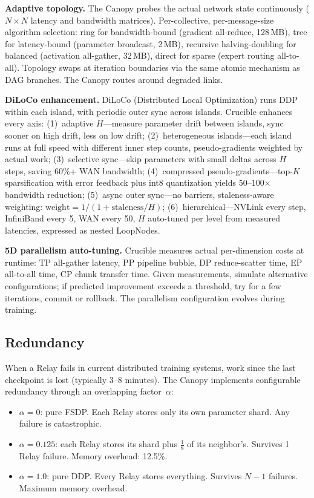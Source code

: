 \textbf{Adaptive topology.}
The Canopy probes the actual network state continuously ($N \times N$ latency and bandwidth matrices).
Per-collective, per-message-size algorithm selection: ring for bandwidth-bound (gradient all-reduce, 128\,MB), tree for latency-bound (parameter broadcast, 2\,MB), recursive halving-doubling for balanced (activation all-gather, 32\,MB), direct for sparse (expert routing all-to-all).
Topology swaps at iteration boundaries via the same atomic mechanism as DAG branches.
The Canopy routes around degraded links.

\textbf{DiLoCo enhancement.}
DiLoCo (Distributed Local Optimization) runs DDP within each island, with periodic outer sync across islands.
Crucible enhances every axis:
(1)~adaptive $H$---measure parameter drift between islands, sync sooner on high drift, less on low drift;
(2)~heterogeneous islands---each island runs at full speed with different inner step counts, pseudo-gradients weighted by actual work;
(3)~selective sync---skip parameters with small deltas across $H$ steps, saving 60\%+ WAN bandwidth;
(4)~compressed pseudo-gradients---top-$K$ sparsification with error feedback plus int8 quantization yields 50--100$\times$ bandwidth reduction;
(5)~async outer sync---no barriers, staleness-aware weighting: $\text{weight} = 1/(1 + \text{staleness}/H)$;
(6)~hierarchical---NVLink every step, InfiniBand every 5, WAN every 50, $H$ auto-tuned per level from measured latencies, expressed as nested LoopNodes.

\textbf{5D parallelism auto-tuning.}
Crucible measures actual per-dimension costs at runtime: TP all-gather latency, PP pipeline bubble, DP reduce-scatter time, EP all-to-all time, CP chunk transfer time.
Given measurements, simulate alternative configurations; if predicted improvement exceeds a threshold, try for a few iterations, commit or rollback.
The parallelism configuration evolves during training.

\subsection{Redundancy}

When a Relay fails in current distributed training systems, work since the last checkpoint is lost (typically 3--8 minutes).
The Canopy implements configurable redundancy through an overlapping factor~$\alpha$:

\begin{itemize}
  \item $\alpha = 0$: pure FSDP. Each Relay stores only its own parameter shard. Any failure is catastrophic.
  \item $\alpha = 0.125$: each Relay stores its shard plus $\frac{1}{8}$ of its neighbor's. Survives 1 Relay failure. Memory overhead: 12.5\%.
  \item $\alpha = 1.0$: pure DDP. Every Relay stores everything. Survives $N{-}1$ failures. Maximum memory overhead.
\end{itemize}

